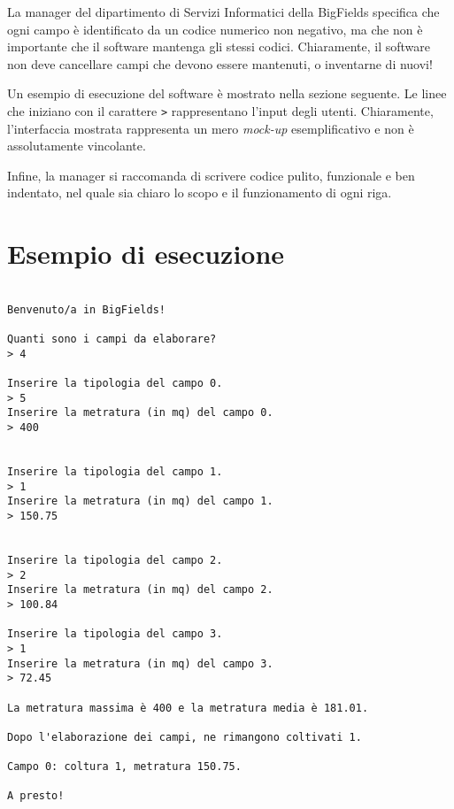 \documentclass[a4paper, 11pt]{exam}
\begin{document}
La manager del dipartimento di Servizi Informatici della BigFields specifica che ogni campo è identificato da un codice numerico non negativo, ma che non è importante che il software mantenga gli stessi codici. 
Chiaramente, il software non deve cancellare campi che devono essere mantenuti, o inventarne di nuovi!

Un esempio di esecuzione del software è mostrato nella sezione seguente. 
Le linee che iniziano con il carattere \texttt{>} rappresentano l'input degli utenti.
Chiaramente, l'interfaccia mostrata rappresenta un mero \textit{mock-up} esemplificativo e non è assolutamente vincolante. 

Infine, la manager si raccomanda di scrivere codice pulito, funzionale e ben indentato, nel quale sia chiaro lo scopo e il funzionamento di ogni riga.
\pagebreak
\maketitle
\section*{Esempio di esecuzione}

\begin{verbatim}

Benvenuto/a in BigFields! 

Quanti sono i campi da elaborare?
> 4

Inserire la tipologia del campo 0.
> 5
Inserire la metratura (in mq) del campo 0.
> 400


Inserire la tipologia del campo 1.
> 1
Inserire la metratura (in mq) del campo 1.
> 150.75


Inserire la tipologia del campo 2.
> 2
Inserire la metratura (in mq) del campo 2.
> 100.84

Inserire la tipologia del campo 3.
> 1
Inserire la metratura (in mq) del campo 3.
> 72.45

La metratura massima è 400 e la metratura media è 181.01.

Dopo l'elaborazione dei campi, ne rimangono coltivati 1.

Campo 0: coltura 1, metratura 150.75.

A presto!
\end{verbatim}
\end{document}
